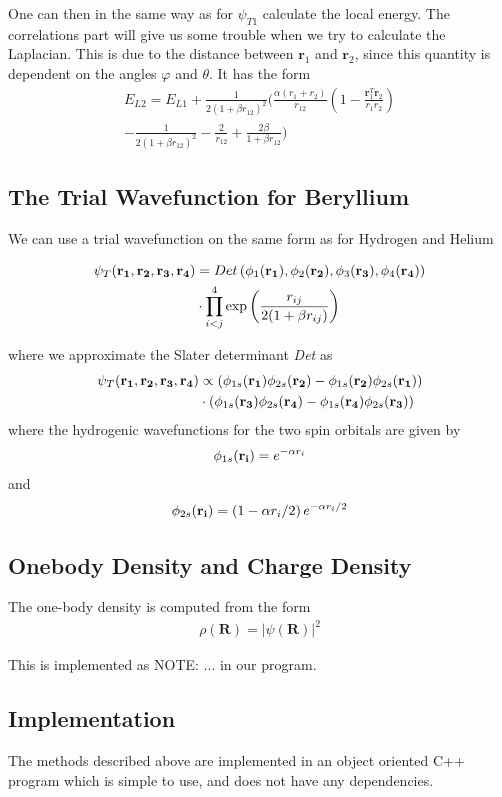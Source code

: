 \documentclass[twocolumns, a4paper,11pt,fleqn]{extarticle}
\newcommand{\eq}[1]{{\small\begin{align*}#1\end{align*}}}
\renewcommand\vec[1]{\boldsymbol{\mathbf{#1}}}
\begin{document}
One can then in the same way as for $\psi_{T1}$ calculate
the local energy. The correlations part will give us some trouble
when we try to calculate the Laplacian. This is due to
the distance between $\vec r_1$ and $\vec r_2$, since this quantity
is dependent on the angles $\varphi$ and $\theta$.
It has the form
{\small
\eq{
	E_{L2} = E_{L1}+\frac{1}{2(1+\beta r_{12})^2}
	\bigg(\frac{\alpha(r_1+r_2)}{r_{12}}(1-
	\frac{\mathbf{r}_1^T\mathbf{r}_2}{r_1r_2})\\
	-\frac{1}{2(1+\beta r_{12})^2}-\frac{2}{r_{12}}+
	\frac{2\beta}{1+\beta r_{12}}\bigg)
}}%

\subsection{The Trial Wavefunction for Beryllium}
We can use a trial wavefunction on the same form as for
Hydrogen and Helium

{\small
\eq{
	\psi_{T}({\bf r_1},{\bf r_2}, {\bf r_3}, {\bf r_4}) &= 
 	Det\left(\phi_{1}({\bf r_1}),\phi_{2}({\bf r_2}),
	\phi_{3}({\bf r_3}),\phi_{4}({\bf r_4})\right)\\ &\cdot
   	\prod_{i<j}^{4}\exp{\left(\frac{r_{ij}}{2(1+\beta r_{ij})}\right)}
}}%

where we approximate the Slater determinant \textit{Det} as
{\small
\eq{
	\psi_{T}({\bf r_1},{\bf r_2}, {\bf r_3}, {\bf r_4})&\propto 
	\left(\phi_{1s}({\bf r_1})\phi_{2s}({\bf r_2})-\phi_{1s}({\bf r_2})
	\phi_{2s}({\bf r_1})\right)\\
	&\cdot\left(\phi_{1s}({\bf r_3})\phi_{2s}({\bf r_4})
	-\phi_{1s}({\bf r_4})\phi_{2s}({\bf r_3})\right)
}}%
where the hydrogenic wavefunctions for the two spin orbitals
are given by
{\small\eq{
\phi_{1s}({\bf r_i}) = e^{-\alpha r_i}
}} and
{\small\eq{
\phi_{2s}({\bf r_i}) = \left(1-\alpha r_i/2\right)e^{-\alpha r_i/2}
}}

\subsection{Onebody Density and Charge Density}
The one-body density is computed from the form 
{\small
\eq{
	\rho(\vec R) = |\psi(\vec R)|^2
}}%

This is implemented as NOTE: ... in our program. 

\subsection{Implementation}
The methods described above are implemented in an object oriented C++ program
which is simple to use, and does not have any dependencies. 
\end{document}
